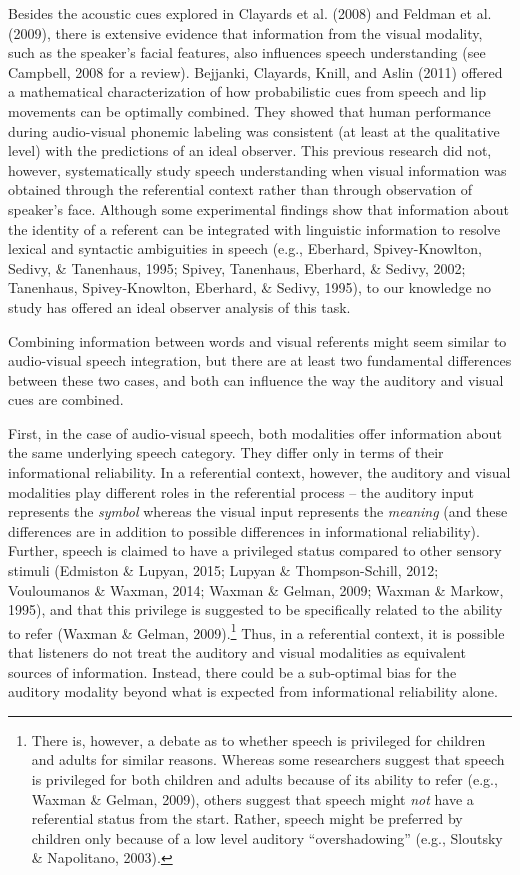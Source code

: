 \documentclass[english,floatsintext,man]{apa6}
\theoremstyle{definition}
\theoremstyle{definition}
\theoremstyle{definition}
\theoremstyle{remark}
\begin{document}
Besides the acoustic cues explored in Clayards et al. (2008) and Feldman
et al. (2009), there is extensive evidence that information from the
visual modality, such as the speaker's facial features, also influences
speech understanding (see Campbell, 2008 for a review). Bejjanki,
Clayards, Knill, and Aslin (2011) offered a mathematical
characterization of how probabilistic cues from speech and lip movements
can be optimally combined. They showed that human performance during
audio-visual phonemic labeling was consistent (at least at the
qualitative level) with the predictions of an ideal observer. This
previous research did not, however, systematically study speech
understanding when visual information was obtained through the
referential context rather than through observation of speaker's face.
Although some experimental findings show that information about the
identity of a referent can be integrated with linguistic information to
resolve lexical and syntactic ambiguities in speech (e.g., Eberhard,
Spivey-Knowlton, Sedivy, \& Tanenhaus, 1995; Spivey, Tanenhaus,
Eberhard, \& Sedivy, 2002; Tanenhaus, Spivey-Knowlton, Eberhard, \&
Sedivy, 1995), to our knowledge no study has offered an ideal observer
analysis of this task.

Combining information between words and visual referents might seem
similar to audio-visual speech integration, but there are at least two
fundamental differences between these two cases, and both can influence
the way the auditory and visual cues are combined.

First, in the case of audio-visual speech, both modalities offer
information about the same underlying speech category. They differ only
in terms of their informational reliability. In a referential context,
however, the auditory and visual modalities play different roles in the
referential process -- the auditory input represents the \emph{symbol}
whereas the visual input represents the \emph{meaning} (and these
differences are in addition to possible differences in informational
reliability). Further, speech is claimed to have a privileged status
compared to other sensory stimuli (Edmiston \& Lupyan, 2015; Lupyan \&
Thompson-Schill, 2012; Vouloumanos \& Waxman, 2014; Waxman \& Gelman,
2009; Waxman \& Markow, 1995), and that this privilege is suggested to
be specifically related to the ability to refer (Waxman \& Gelman,
2009).\footnote{There is, however, a debate as to whether speech is
  privileged for children and adults for similar reasons. Whereas some
  researchers suggest that speech is privileged for both children and
  adults because of its ability to refer (e.g., Waxman \& Gelman, 2009),
  others suggest that speech might \emph{not} have a referential status
  from the start. Rather, speech might be preferred by children only
  because of a low level auditory ``overshadowing'' (e.g., Sloutsky \&
  Napolitano, 2003).} Thus, in a referential context, it is possible
that listeners do not treat the auditory and visual modalities as
equivalent sources of information. Instead, there could be a sub-optimal
bias for the auditory modality beyond what is expected from
informational reliability alone.
\end{document}
